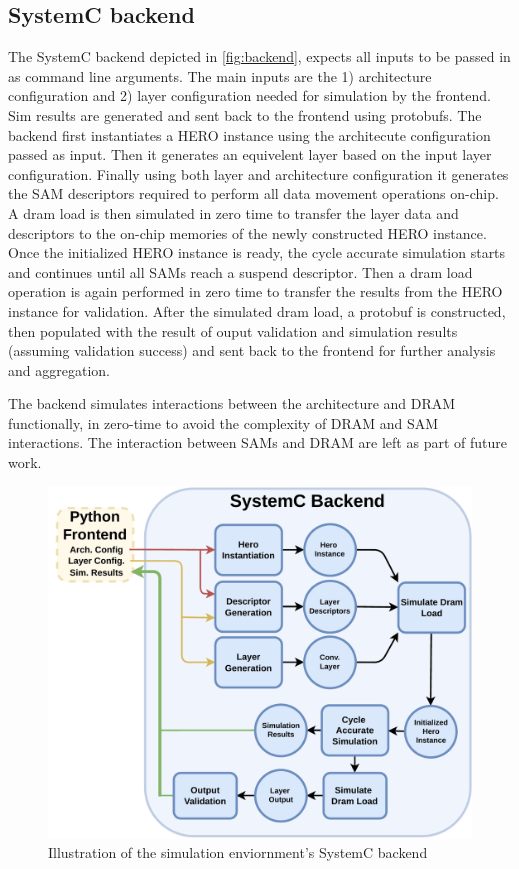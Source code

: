 \subsection{SystemC backend}
\label{chap:hero:sim_platform:backend}

The SystemC backend depicted in \autoref{fig:backend}, expects all inputs to be passed in as command line
arguments. The main inputs are the 1) architecture configuration and 2) layer
configuration needed for simulation by the frontend. Sim results are generated
and sent back to the frontend using protobufs. The backend first instantiates a
HERO instance using the architecute configuration passed as input. Then it
generates an equivelent layer based on the input layer configuration. Finally
using both layer and architecture configuration it generates the SAM descriptors
required to perform all data movement operations on-chip. A dram load is then
simulated in zero time to transfer the layer data and descriptors to the on-chip
memories of the newly constructed HERO instance. Once the initialized HERO
instance is ready, the cycle accurate simulation starts and continues until all
SAMs reach a suspend descriptor. Then a dram load operation is again performed
in zero time to transfer the results from the HERO instance for validation.
After the simulated dram load, a protobuf is constructed, then populated with
the result of ouput validation and simulation results (assuming validation
success) and sent back to the frontend for further analysis and aggregation. 

The backend simulates interactions between the architecture and DRAM
functionally, in zero-time to avoid the complexity of DRAM and SAM interactions.
The interaction between SAMs and DRAM are left as part of future work. 

\begin{figure}[ht]
    \centering
    \includegraphics[scale=0.5]{fig/hero-sim-backend.pdf}
    \caption{Illustration of the simulation enviornment's SystemC backend}
    \label{fig:backend}
\end{figure}

